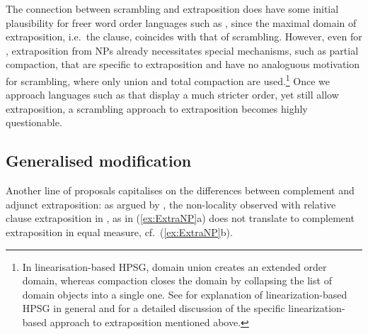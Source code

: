 \documentclass[output=paper
,notxmath 
	        ,collection
	        ,collectionchapter
 	        ,biblatex
                ,babelshorthands
                ,newtxmath
                ,draftmode
                ,colorlinks, citecolor=brown
]{langscibook}
\begin{document}
The connection between scrambling and extraposition does have some
initial plausibility for freer word order languages such as ,
since the maximal domain of extraposition, i.e.\ the clause, coincides
with that of scrambling. However, even for , extraposition from
NPs already necessitates special mechanisms, such as partial
compaction, that are specific to extraposition and have no analoguous
motivation for scrambling, where only union and total compaction are
used.\footnote{In linearisation-based HPSG, domain union creates an
  extended order domain, whereas compaction closes the domain by
  collapsing the list of domain objects into a single one. See  for
  explanation of linearization-based HPSG in general and
   for a detailed discussion of the specific linearization-based
  approach to extraposition mentioned above.
} Once we
approach languages such as  that display a much stricter order,
yet still allow extraposition, a scrambling approach to extraposition
becomes highly questionable.


\subsection{Generalised modification}

Another line of proposals capitalises on the differences between
complement and adjunct extraposition: as argued by
\citet[284]{kiss_t02nllt}, the non-locality observed with relative clause
extraposition in , as in (\ref{ex:ExtraNP}a)  does not translate to complement extraposition
in equal measure, cf.~(\ref{ex:ExtraNP}b).
\eal
\label{ex:ExtraNP}

\zl
\end{document}
